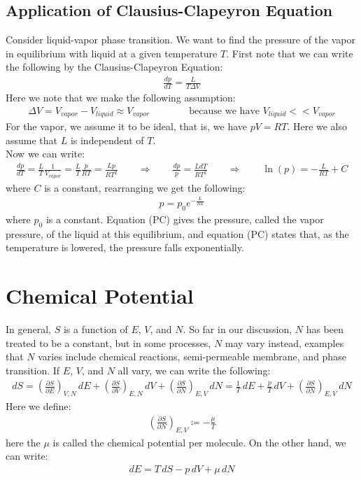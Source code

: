 \documentclass[11pt,oneside]{book}
\theoremstyle{break}
\theoremstyle{break}
\newcommand{\pd}{\partial}
\newcommand{\lr}[1]{\left( #1 \right)}
\begin{document}
\subsection{Application of Clausius-Clapeyron Equation}
Consider liquid-vapor phase transition. We want to find the pressure of the vapor in equilibrium with liquid at a given temperature $T$. First note that we can write the following by the Clausius-Clapeyron Equation:
\begin{align*}
\frac{dp}{dT} = \frac{L}{T \Delta V}
\end{align*}
Here we note that we make the following assumption:
\begin{align*}
\Delta V = V_{vapor} - V_{liquid} \approx V_{vapor}\qquad\qquad \text{because we have }V_{liquid}<<V_{vapor}
\end{align*}
For the vapor, we assume it to be ideal, that is, we have $pV = RT$. Here we also assume that $L$ is independent of $T$.\\

Now we can write:
\begin{align*}
\frac{dp}{dT} = \frac{L}{T} \frac{1}{V_{vapor}} = \frac{L}{T} \frac{p}{RT} = \frac{Lp}{RT^2} \qquad \Rightarrow \qquad \frac{dp}{p} = \frac{L dT}{RT^2} \qquad \Rightarrow \qquad \ln(p) = -\frac{L}{RT} + C
\end{align*}
where $C$ is a constant, rearranging we get the following:
\begin{align*}
p = p_0 e^{-\frac{L}{RT}} \tag{PC}
\end{align*}
where $p_0$ is a constant. Equation (PC) gives the pressure, called the vapor pressure, of the liquid at this equilibrium, and equation (PC) states that, as the temperature is lowered, the pressure falls exponentially.\\

\newpage
\section[Chemical Potential]{\color{red}Chemical Potential \color{black}}
In general, $S$ is a function of $E$, $V$, and $N$. So far in our discussion, $N$ has been treated to be a constant, but in some processes, $N$ may vary instead, examples that $N$ varies include chemical reactions, semi-permeable membrane, and phase transition. If $E$, $V$, and $N$ all vary, we can write the following:
\begin{align*}
dS = \lr{\frac{\pd S}{\pd E}}_{V,N} \, dE +  \lr{\frac{\pd S}{\pd V}}_{E,N} \, dV +  \lr{\frac{\pd S}{\pd N}}_{E,V} \, dN = \frac{1}{T}\, dE + \frac{p}{T}\, dV + \lr{\frac{\pd S}{\pd N}}_{E,V} \, dN \tag{CPS}
\end{align*}
Here we define:
\begin{align*}
\lr{\frac{\pd S}{\pd N}}_{E,V} \coloneqq - \frac{\mu}{T}
\end{align*}
here the $\mu$ is called the chemical potential per molecule. On the other hand, we can write:
\begin{align*}
dE = T\, dS - p\, dV + \mu \, dN
\end{align*}
\end{document}

